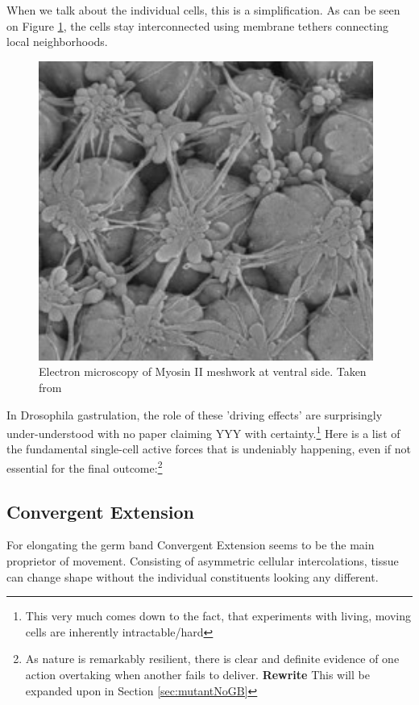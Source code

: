When we talk about the individual cells, this is a simplification. As can be seen on Figure \ref{fig:mysosinMeshwork}, the cells stay interconnected using membrane tethers connecting local neighborhoods. 

\begin{figure}[H]
    \centering
    \includegraphics[width=0.6\linewidth]{chapters/Theory/figures/EM_constricting_proteins.png}
    \caption{Electron microscopy of Myosin II meshwork at ventral side. Taken from \cite{martin2010integration}}
    \label{fig:mysosinMeshwork}
\end{figure}

In Drosophila gastrulation, the role of these 'driving effects' are surprisingly under-understood with no paper claiming YYY with certainty.\footnote{This very much comes down to the fact, that experiments with living, moving cells are inherently intractable/hard} Here is a list of the fundamental single-cell active forces that is undeniably happening, even if not essential for the final outcome:\footnote{As nature is remarkably resilient, there is clear and definite evidence of one action overtaking when another fails to deliver. \textbf{Rewrite} This will be expanded upon in Section \ref{sec:mutantNoGB}} 

\subsection{Convergent Extension}
For elongating the germ band Convergent Extension seems to be the main proprietor of movement. Consisting of asymmetric cellular intercolations, tissue can change shape without the individual constituents looking any different.  


